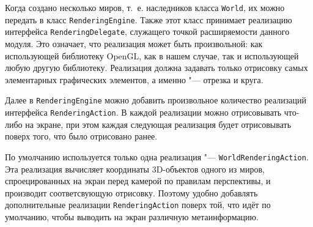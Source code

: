 Когда создано несколько миров, т.~е. наследников класса \texttt{World}, их можно передать в класс
\texttt{RenderingEngine}. Также этот класс принимает реализацию интерфейса \texttt{RenderingDelegate}, служащего точкой
расширяемости данного модуля. Это означает, что реализация может быть произвольной: как использующей библиотеку
OpenGL, как в нашем случае, так и использующей любую другую библиотеку. Реализация должна задавать только отрисовку
самых элементарных графических элементов, а именно "--- отрезка и круга.

Далее в \texttt{RenderingEngine} можно добавить произвольное количество реализаций интерфейса \texttt{RenderingAction}.
В каждой реализации можно отрисовывать что-либо на экране, при этом каждая следующая реализация будет отрисовывать
поверх того, что было отрисовано ранее.

По умолчанию используется только одна реализация "--- \texttt{WorldRenderingAc\-tion}. Эта реализация вычисляет
координаты 3D-объектов одного из миров, спроецированных на экран перед камерой по правилам перспективы,
и производит соответсвующую отрисовку. Поэтому удобно добавлять дополнительные реализации \texttt{RenderingAc\-tion}
поверх той, что идёт по умолчанию, чтобы выводить на экран различную метаинформацию.
